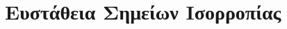 






    
\chapter{Ευστάθεια Σημείων Ισορροπίας}


\vspace{\baselineskip}


\vspace{\baselineskip}


